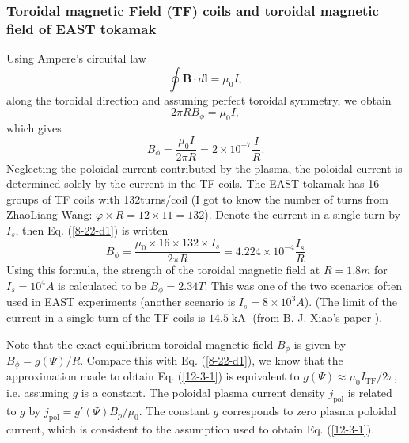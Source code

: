 \documentclass{llncs}
\newcommand{\tmop}[1]{\ensuremath{\operatorname{#1}}}
\begin{document}
\subsubsection{Toroidal magnetic Field (TF) coils and toroidal magnetic field
of EAST tokamak}

Using Ampere's circuital law
\begin{equation}
  \label{9-5-8} \oint \mathbf{B} \cdot d\mathbf{l}= \mu_0 I,
\end{equation}
along the toroidal direction and assuming perfect toroidal symmetry, we obtain
\begin{equation}
  2 \pi R B_{\phi} = \mu_0 I,
\end{equation}
which gives
\begin{equation}
  \label{8-22-d1} B_{\phi} = \frac{\mu_0 I}{2 \pi R} = 2 \times 10^{- 7}
  \frac{I}{R} .
\end{equation}
Neglecting the poloidal current contributed by the plasma, the poloidal
current is determined solely by the current in the TF coils. The EAST tokamak
has 16 groups of TF coils with 132turns/coil (I got to know the number of
turns from ZhaoLiang Wang: $\varphi \times R = 12 \times 11 = 132$). Denote
the current in a single turn by $I_s$, then Eq. (\ref{8-22-d1}) is written
\begin{equation}
  \label{12-3-1} B_{\phi} = \frac{\mu_0 \times 16 \times 132 \times I_s}{2 \pi
  R} = 4.224 \times 10^{- 4} \frac{I_s}{R}
\end{equation}
Using this formula, the strength of the toroidal magnetic field at $R = 1.8 m$
for $I_s = 10^4 A$ is calculated to be $B_{\phi} = 2.34 T$. This was one of
the two scenarios often used in EAST experiments (another scenario is $I_s = 8
\times 10^3 A$). (The limit of the current in a single turn of the TF coils is
$14.5 \tmop{kA}$ (from B. J. Xiao's paper {\cite{xiao2008}}).

Note that the exact equilibrium toroidal magnetic field $B_{\phi}$ is given by
$B_{\phi} = g (\Psi) / R$. Compare this with Eq. (\ref{8-22-d1}), we know that
the approximation made to obtain Eq. (\ref{12-3-1}) is equivalent to $g (\Psi)
\approx \mu_0 I_{\tmop{TF}} / 2 \pi$, i.e. assuming $g$ is a constant. The
poloidal plasma current density $j_{\tmop{pol}}$ is related to $g$ by
$j_{\tmop{pol}} = g' (\Psi) B_p / \mu_0$. The constant $g$ corresponds to zero
plasma poloidal current, which is consistent to the assumption used to obtain
Eq. (\ref{12-3-1}).
\end{document}
